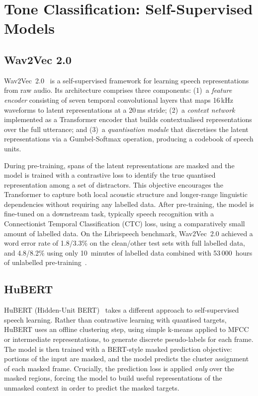 \section{Tone Classification: Self-Supervised Models}
\label{sec:sota:ssl}

\subsection{Wav2Vec 2.0}

Wav2Vec~2.0~\cite{baevski2020} is a self-supervised framework for learning speech representations from raw audio. Its architecture comprises three components: (1)~a \emph{feature encoder} consisting of seven temporal convolutional layers that maps 16\,kHz waveforms to latent representations at a 20\,ms stride; (2)~a \emph{context network} implemented as a Transformer encoder that builds contextualised representations over the full utterance; and (3)~a \emph{quantisation module} that discretises the latent representations via a Gumbel-Softmax operation, producing a codebook of speech units.

During pre-training, spans of the latent representations are masked and the model is trained with a contrastive loss to identify the true quantised representation among a set of distractors. This objective encourages the Transformer to capture both local acoustic structure and longer-range linguistic dependencies without requiring any labelled data. After pre-training, the model is fine-tuned on a downstream task, typically speech recognition with a Connectionist Temporal Classification (CTC) loss, using a comparatively small amount of labelled data. On the Librispeech benchmark, Wav2Vec~2.0 achieved a word error rate of 1.8/3.3\% on the clean/other test sets with full labelled data, and 4.8/8.2\% using only 10~minutes of labelled data combined with 53\,000~hours of unlabelled pre-training~\cite{baevski2020}.

\subsection{HuBERT}

HuBERT (Hidden-Unit BERT)~\cite{hsu2021} takes a different approach to self-supervised speech learning. Rather than contrastive learning with quantised targets, HuBERT uses an offline clustering step, using simple k-means applied to MFCC or intermediate representations, to generate discrete pseudo-labels for each frame. The model is then trained with a BERT-style masked prediction objective: portions of the input are masked, and the model predicts the cluster assignment of each masked frame. Crucially, the prediction loss is applied \emph{only} over the masked regions, forcing the model to build useful representations of the unmasked context in order to predict the masked targets.

